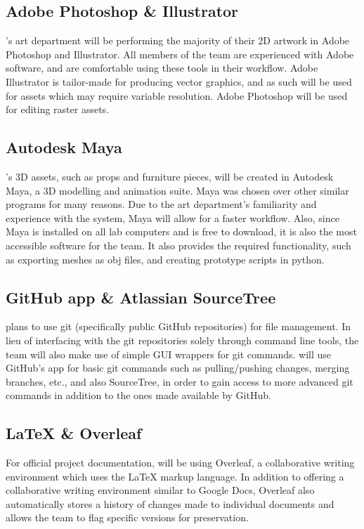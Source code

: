 \documentclass{GlobalDocument}
\begin{document}
\subsection{Adobe Photoshop \& Illustrator}
\ourteam{}'s art department will be performing the majority of their 2D artwork in Adobe Photoshop and Illustrator. All members of the team are experienced with Adobe software, and are comfortable using these tools in their workflow. Adobe Illustrator is tailor-made for producing vector graphics, and as such will be used for assets which may require variable resolution. Adobe Photoshop will be used for editing raster assets.

\subsection{Autodesk Maya}
\ourgame{}'s 3D assets, such as props and furniture pieces, will be created in Autodesk Maya, a 3D modelling and animation suite. Maya was chosen over other similar programs for many reasons. Due to the art department's familiarity and experience with the system, Maya will allow for a faster workflow. Also, since Maya is installed on all lab computers and is free to download, it is also the most accessible software for the team. It also provides the required functionality, such as exporting meshes as obj files, and creating prototype scripts in python. 

\subsection{GitHub app \& Atlassian SourceTree}
\ourteam{} plans to use git (specifically public GitHub repositories) for file management. In lieu of interfacing with the git repositories solely through command line tools, the team will also make use of simple GUI wrappers for git commands. \ourteam{} will use GitHub's app for basic git commands such as pulling/pushing changes, merging branches, etc., and also SourceTree, in order to gain access to more advanced git commands in addition to the ones made available by GitHub.

\subsection{\LaTeX{} \& Overleaf}
For official project documentation, \ourteam{} will be using Overleaf, a collaborative writing environment which uses the \LaTeX{} markup language. In addition to offering a collaborative writing environment similar to Google Docs, Overleaf also automatically stores a history of changes made to individual documents and allows the team to flag specific versions for preservation.
\end{document}
